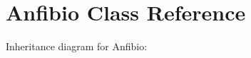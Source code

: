 \hypertarget{classAnfibio}{}\section{Anfibio Class Reference}
\label{classAnfibio}


Inheritance diagram for Anfibio\+:
